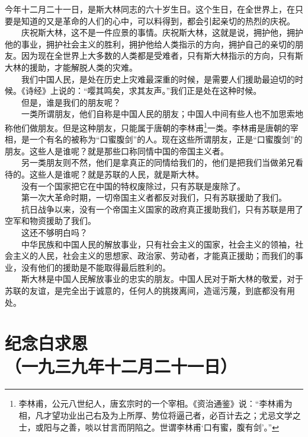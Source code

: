 \documentclass[cn,11pt,chinese]{elegantbook}
\def\myformat#1{\hfil\hfil #1}
\begin{document}
今年十二月二十一日，是斯大林同志的六十岁生日。这个生日，在全世界上，在只要是知道的又是革命的人们的心中，可以料得到，都会引起亲切的热烈的庆祝。\\
　　庆祝斯大林，这不是一件应景的事情。庆祝斯大林，这就是说，拥护他，拥护他的事业，拥护社会主义的胜利，拥护他给人类指示的方向，拥护自己的亲切的朋友。因为现在全世界上大多数的人类都是受难者，只有斯大林指示的方向，只有斯大林的援助，才能解脱人类的灾难。\\
　　我们中国人民，是处在历史上灾难最深重的时候，是需要人们援助最迫切的时候。《诗经》上说的：“嘤其鸣矣，求其友声。”我们正是处在这种时候。\\
　　但是，谁是我们的朋友呢？\\
　　一类所谓朋友，他们自称是中国人民的朋友；中国人中间有些人也不加思索地称他们做朋友。但是这种朋友，只能属于唐朝的李林甫\footnote[1]{李林甫，公元八世纪人，唐玄宗时的一个宰相。《资治通鉴》说：“李林甫为相，凡才望功业出己右及为上所厚、势位将逼己者，必百计去之；尤忌文学之士，或阳与之善，啖以甘言而阴陷之。世谓李林甫‘口有蜜，腹有剑’。”}一类。李林甫是唐朝的宰相，是一个有名的被称为“口蜜腹剑”的人。现在这些所谓朋友，正是“口蜜腹剑”的朋友。这些人是谁呢？就是那些口称同情中国的帝国主义者。\\
　　另一类朋友则不然，他们是拿真正的同情给我们的，他们是把我们当做弟兄看待的。这些人是谁呢？就是苏联的人民，就是斯大林。\\
　　没有一个国家把它在中国的特权废除过，只有苏联是废除了。\\
　　第一次大革命时期，一切帝国主义者都反对我们，只有苏联援助了我们。\\
　　抗日战争以来，没有一个帝国主义国家的政府真正援助我们，只有苏联是用了空军和物资援助了我们。\\
　　这还不够明白吗？\\
　　中华民族和中国人民的解放事业，只有社会主义的国家，社会主义的领袖，社会主义的人民，社会主义的思想家、政治家、劳动者，才能真正援助；而我们的事业，没有他们的援助是不能取得最后胜利的。\\
　　斯大林是中国人民解放事业的忠实的朋友。中国人民对于斯大林的敬爱，对于苏联的友谊，是完全出于诚意的，任何人的挑拨离间，造谣污蔑，到底都没有用处。\\
\newpage\section*{\myformat{纪念白求恩}\\\myformat{（一九三九年十二月二十一日）}}
\end{document}
